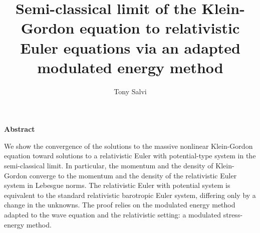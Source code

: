 \documentclass[a4paper, 15pt]{article}
\title{Semi-classical limit of the Klein-Gordon equation to relativistic Euler equations via an adapted modulated energy method}
\author[]{Tony Salvi}
\date{}
\numberwithin{equation}{section}
\begin{document}
\maketitle

\begin{center}
    \textbf{Abstract}
    \hfill\begin{minipage}{\dimexpr\textwidth-1cm}
    
	We show the convergence of the solutions to the massive nonlinear Klein-Gordon equation toward solutions to a relativistic Euler with potential-type system in the semi-classical limit. In particular, the momentum and the density of Klein-Gordon converge to the momentum and the density of the relativistic Euler system in Lebesgue norms. The relativistic Euler with potential system is equivalent to the standard relativistic barotropic Euler system, differing only by a change in the unknowns. The proof relies on the modulated energy method adapted to the wave equation and the relativistic setting: a modulated stress-energy method. 
\end{minipage}
\end{center}
\tableofcontents
\end{document}
